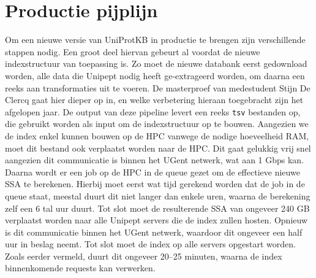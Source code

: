 \section{Productie pijplijn}
Om een nieuwe versie van UniProtKB in productie te brengen zijn verschillende stappen nodig.
Een groot deel hiervan gebeurt al voordat de nieuwe indexstructuur van toepassing is.
Zo moet de nieuwe databank eerst gedownload worden, alle data die Unipept nodig heeft ge-extrageerd worden, om daarna een reeks aan transformaties uit te voeren.
De masterproef van medestudent Stijn De Clercq gaat hier dieper op in, en welke verbetering hieraan toegebracht zijn het afgelopen jaar.
De output van deze pipeline levert een reeks \texttt{tsv} bestanden op, die gebruikt worden als input om de indexstructuur op te bouwen.
Aangezien we de index enkel kunnen bouwen op de HPC vanwege de nodige hoeveelheid RAM, moet dit bestand ook verplaatst worden naar de HPC\@.
Dit gaat gelukkig vrij snel aangezien dit communicatie is binnen het UGent netwerk, wat aan 1 Gbps kan. %
Daarna wordt er een job op de HPC in de queue gezet om de effectieve nieuwe SSA te berekenen.
Hierbij moet eerst wat tijd gerekend worden dat de job in de queue staat, meestal duurt dit niet langer dan enkele uren, waarna de berekening zelf een 6 tal uur duurt.
Tot slot moet de resulterende SSA van ongeveer 240 GB verplaatst worden naar alle Unipept servers die de index zullen hosten.
Opnieuw is dit communicatie binnen het UGent netwerk, waardoor dit ongeveer een half uur in beslag neemt.
Tot slot moet de index op alle servers opgestart worden.
Zoals eerder vermeld, duurt dit ongeveer 20--25 minuten, waarna de index binnenkomende requests kan verwerken.




